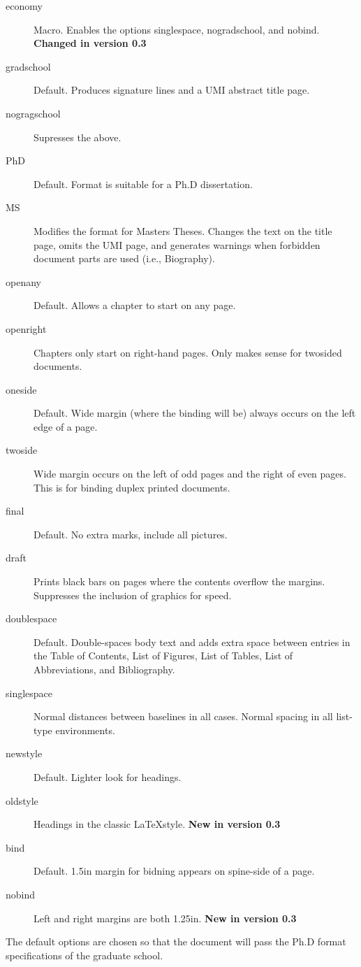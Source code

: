 \begin{description}
\item[economy]
Macro. Enables the options singlespace, nogradschool, and nobind.
\textbf{Changed in version 0.3}
\item[gradschool]
Default. Produces signature lines and a UMI abstract title page.
\item[nogragschool]
Supresses the above.
\item[PhD]
Default. Format is suitable for a Ph.D dissertation.
\item[MS]
Modifies the format for Masters Theses. Changes the text on the title
page, omits the UMI page, and generates warnings when forbidden document
parts are used (i.e., Biography).
\item[openany]
Default. Allows a chapter to start on any page.
\item[openright]
Chapters only start on right-hand pages. Only makes sense for twosided
documents.
\item[oneside]
Default. Wide margin (where the binding will be) always occurs on the
left edge of a page.
\item[twoside]
Wide margin occurs on the left of odd pages and the right of even pages.
This is for binding duplex printed documents.
\item[final]
Default. No extra marks, include all pictures.
\item[draft]
Prints black bars on pages where the contents overflow the margins.
Suppresses the inclusion of graphics for speed.
\item[doublespace]
Default. Double-spaces body text and adds extra space between entries in
the Table of Contents, List of Figures, List of Tables, List of
Abbreviations, and Bibliography.
\item[singlespace]
Normal distances between baselines in all cases. Normal spacing in all
list-type environments.
\item[newstyle]
Default. Lighter look for headings.
\item[oldstyle]
Headings in the classic LaTeXstyle. \textbf{New in version 0.3}
\item[bind]
Default. 1.5in margin for bidning appears on spine-side of a page.
\item[nobind]
Left and right margins are both 1.25in. \textbf{New in version 0.3}
\end{description}

The default options are chosen so that the document will pass the Ph.D
format specifications of the graduate school.

